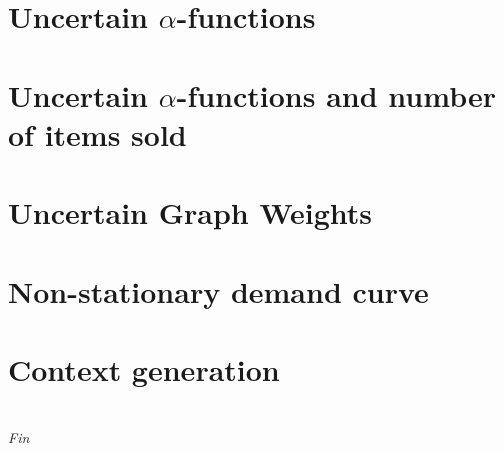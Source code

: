 \documentclass[11pt]{beamer}
\begin{document}
\section{Uncertain \texorpdfstring{$\alpha$}{alpha}-functions}






\section{Uncertain \texorpdfstring{$\alpha$}{alpha}-functions and number of items sold}






\section{Uncertain Graph Weights}






\section{Non-stationary demand curve}






\section{Context generation}





\section{}
\begin{frame}
\centering \Large
\textit{Fin}
\end{frame}
\end{document}
